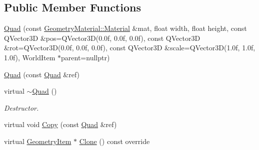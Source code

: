 \subsection*{Public Member Functions}
\begin{DoxyCompactItemize}
\item 
\mbox{\hyperlink{class_geometry_engine_1_1_geometry_world_item_1_1_geometry_item_1_1_quad_ab311d3ec0cd86c53fcdf019fde0f5d69}{Quad}} (const \mbox{\hyperlink{class_geometry_engine_1_1_geometry_material_1_1_material}{Geometry\+Material\+::\+Material}} \&mat, float width, float height, const Q\+Vector3D \&pos=Q\+Vector3D(0.\+0f, 0.\+0f, 0.\+0f), const Q\+Vector3\+D \&rot=\+Q\+Vector3\+D(0.\+0f, 0.\+0f, 0.\+0f), const Q\+Vector3\+D \&scale=\+Q\+Vector3\+D(1.\+0f, 1.\+0f, 1.\+0f), World\+Item $\ast$parent=nullptr)
\item 
\mbox{\hyperlink{class_geometry_engine_1_1_geometry_world_item_1_1_geometry_item_1_1_quad_a25d297ec0ae154e59539e8aac94de719}{Quad}} (const \mbox{\hyperlink{class_geometry_engine_1_1_geometry_world_item_1_1_geometry_item_1_1_quad}{Quad}} \&ref)
\item 
\mbox{\label{class_geometry_engine_1_1_geometry_world_item_1_1_geometry_item_1_1_quad_aa2e01be326d58b32649be60cafec5883}} 
virtual \mbox{\hyperlink{class_geometry_engine_1_1_geometry_world_item_1_1_geometry_item_1_1_quad_aa2e01be326d58b32649be60cafec5883}{$\sim$\+Quad}} ()
\begin{DoxyCompactList}\small\item\em Destructor. \end{DoxyCompactList}\item 
virtual void \mbox{\hyperlink{class_geometry_engine_1_1_geometry_world_item_1_1_geometry_item_1_1_quad_a560a98ecd908921a42b9f1adf93115b3}{Copy}} (const \mbox{\hyperlink{class_geometry_engine_1_1_geometry_world_item_1_1_geometry_item_1_1_quad}{Quad}} \&ref)
\item 
virtual \mbox{\hyperlink{class_geometry_engine_1_1_geometry_world_item_1_1_geometry_item_1_1_geometry_item}{Geometry\+Item}} $\ast$ \mbox{\hyperlink{class_geometry_engine_1_1_geometry_world_item_1_1_geometry_item_1_1_quad_ad3a6d04a38253d1f26735a87a53a5446}{Clone}} () const override
\end{DoxyCompactItemize}
